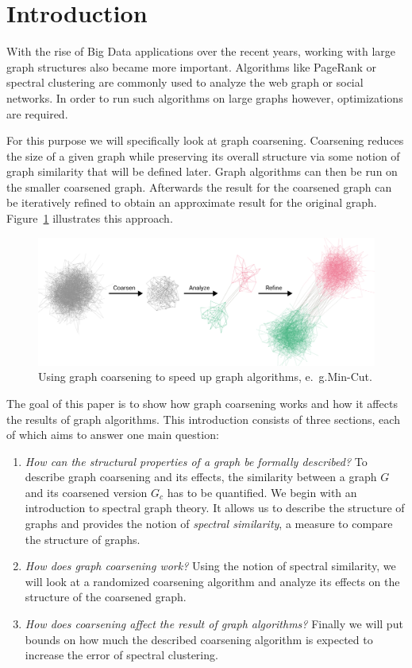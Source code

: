 \section{Introduction}%
\label{sec:intro}

\setcounter{page}{1}			%

With the rise of Big Data applications over the recent years, working with large graph structures also became more important.
Algorithms like PageRank or spectral clustering are commonly used to analyze the web graph or social networks.
In order to run such algorithms on large graphs however, optimizations are required.

For this purpose we will specifically look at graph coarsening.
Coarsening reduces the size of a given graph while preserving its overall structure via some notion of graph similarity that will be defined later.
Graph algorithms can then be run on the smaller coarsened graph.
Afterwards the result for the coarsened graph can be iteratively refined to obtain an approximate result for the original graph.
Figure~\ref{fig:intro:overview} illustrates this approach.
\begin{figure}
	\centering
	\includegraphics[width=0.8\linewidth]{gfx/intro/overview.pdf}
	\caption{
		Using graph coarsening to speed up graph algorithms, e.~g.\@ Min-Cut.
	}\label{fig:intro:overview}
\end{figure}

The goal of this paper is to show how graph coarsening works and how it affects the results of graph algorithms.
This introduction consists of three sections, each of which aims to answer one main question:
\begin{enumerate}
	\item \textit{How can the structural properties of a graph be formally described?}
		To describe graph coarsening and its effects, the similarity between a graph $G$ and its coarsened version $G_c$ has to be quantified.
		We begin with an introduction to spectral graph theory.
		It allows us to describe the structure of graphs and provides the notion of \textit{spectral similarity}, a measure to compare the structure of graphs.
	\item \textit{How does graph coarsening work?}
		Using the notion of spectral similarity, we will look at a randomized coarsening algorithm and analyze its effects on the structure of the coarsened graph.
	\item \textit{How does coarsening affect the result of graph algorithms?}
		Finally we will put bounds on how much the described coarsening algorithm is expected to increase the error of spectral clustering.
\end{enumerate}
